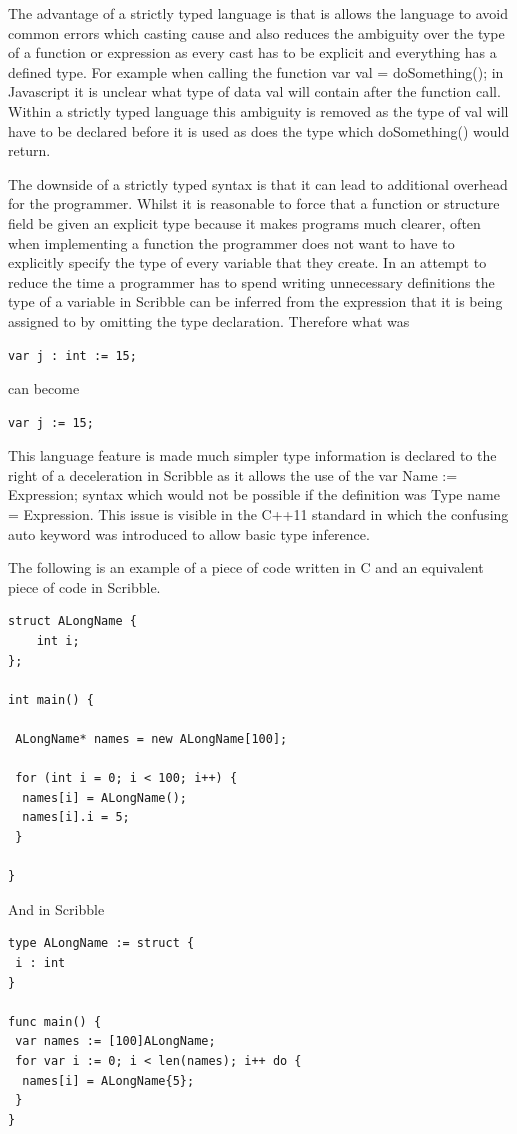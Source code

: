 \documentclass[]{final_report}
\begin{document}
The advantage of a strictly typed language is that is allows the language to avoid common errors which casting cause and also reduces the ambiguity over the type of a function or expression as every cast has to be explicit and everything has a defined type. For example when calling the function var val = doSomething(); in Javascript it is unclear what type of data val will contain after the function call. Within a strictly typed language this ambiguity is removed as the type of val will have to be declared before it is used as does the type which doSomething() would return.

The downside of a strictly typed syntax is that it can lead to additional overhead for the programmer. Whilst it is reasonable to force that a function or structure field be given an explicit type because it makes programs much clearer, often when implementing a function the programmer does not want to have to explicitly specify the type of every variable that they create. In an attempt to reduce the time a programmer has to spend writing unnecessary definitions the type of a variable in Scribble can be inferred from the expression that it is being assigned to by omitting the type declaration. Therefore what was 
\begin{verbatim}
var j : int := 15;
\end{verbatim}
can become \begin{verbatim}
var j := 15;
\end{verbatim}

This language feature is made much simpler type information is declared to the right of a deceleration in Scribble as it allows the use of the var Name := Expression; syntax which would not be possible if the definition was Type name = Expression. This issue is visible in the C++11 standard in which the confusing auto keyword was introduced to allow basic type inference.

The following is an example of a piece of code written in C and an equivalent piece of code in Scribble.

\begin{verbatim}
struct ALongName {
	int i;
};

int main() {

 ALongName* names = new ALongName[100];
 
 for (int i = 0; i < 100; i++) {
  names[i] = ALongName();
  names[i].i = 5;
 }

}
\end{verbatim}
And in Scribble
\begin{verbatim}
type ALongName := struct {
 i : int
}

func main() {
 var names := [100]ALongName;
 for var i := 0; i < len(names); i++ do {
  names[i] = ALongName{5};
 }
}
\end{verbatim}
\end{document}
